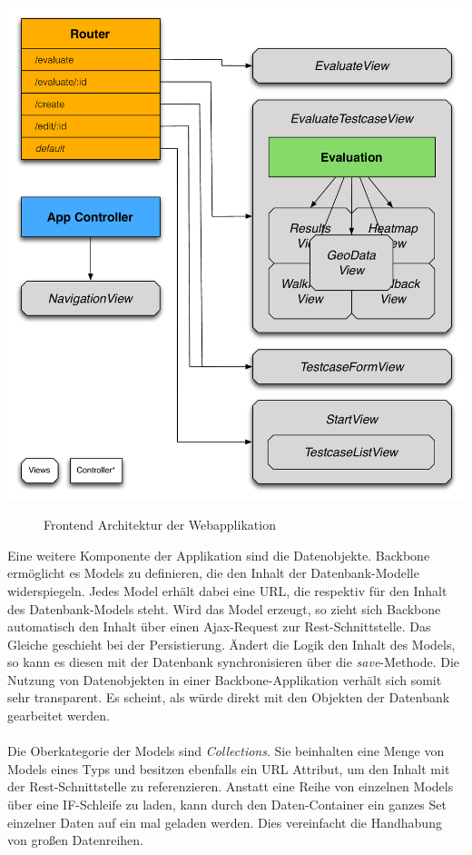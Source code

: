 \begin{center}
\includegraphics[scale=0.55]{./images/architecture}
\end{center}
\begin{figure}[htb]
   \centering
   \caption{Frontend Architektur der Webapplikation}
    \label{webappview}
\end{figure}

Eine weitere Komponente der Applikation sind die Datenobjekte. Backbone ermöglicht es Models zu definieren, die den Inhalt der Datenbank-Modelle widerspiegeln. Jedes Model erhält dabei eine URL, die respektiv für den Inhalt des Datenbank-Models steht. Wird das Model erzeugt, so zieht sich Backbone automatisch den Inhalt über einen Ajax-Request zur Rest-Schnittstelle. Das Gleiche geschieht bei der Persistierung. Ändert die Logik den Inhalt des Models, so kann es diesen mit der Datenbank synchronisieren über die \textit{save}-Methode. Die Nutzung von Datenobjekten in einer Backbone-Applikation verhält sich somit sehr transparent. Es scheint, als würde direkt mit den Objekten der Datenbank gearbeitet werden.\\
\\
Die Oberkategorie der Models sind \textit{Collections}. Sie beinhalten eine Menge von Models eines Typs und besitzen ebenfalls ein URL Attribut, um den Inhalt mit der Rest-Schnittstelle zu referenzieren. Anstatt eine Reihe von einzelnen Models über eine IF-Schleife zu laden, kann durch den Daten-Container ein ganzes Set einzelner Daten auf ein mal geladen werden. Dies vereinfacht die Handhabung von großen Datenreihen.\\

